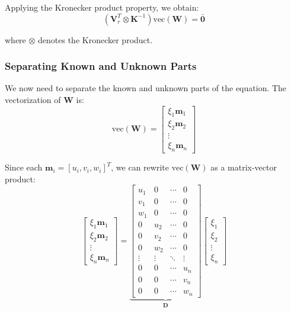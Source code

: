 \documentclass[11pt,a4paper]{article}
\theoremstyle{definition}
\theoremstyle{plain}
\theoremstyle{remark}
\begin{document}
Applying the Kronecker product property, we obtain:
\begin{equation} \nonumber
(\mathbf{V}_r^T \otimes \mathbf{K}^{-1}) \text{vec}(\mathbf{W}) = \bar{\mathbf{0}}
\end{equation}

where $\otimes$ denotes the Kronecker product.

\subsubsection{Separating Known and Unknown Parts}

We now need to separate the known and unknown parts of the equation. The vectorization of $\mathbf{W}$ is:
\begin{equation} \nonumber
\text{vec}(\mathbf{W}) = \begin{bmatrix} \xi_1 \mathbf{m}_1 \\ \xi_2 \mathbf{m}_2 \\ \vdots \\ \xi_n \mathbf{m}_n \end{bmatrix}
\end{equation}

Since each $\mathbf{m}_i = [u_i, v_i, w_i]^T$, we can rewrite $\text{vec}(\mathbf{W})$ as a matrix-vector product:
\begin{equation} \nonumber
\begin{bmatrix} \xi_1 \mathbf{m}_1 \\ \xi_2 \mathbf{m}_2 \\ \vdots \\ \xi_n \mathbf{m}_n \end{bmatrix} = 
\underbrace{\begin{bmatrix} 
    u_1 & 0 & \cdots & 0 \\
    v_1 & 0 & \cdots & 0 \\
    w_1 & 0 & \cdots & 0 \\
    0 & u_2 & \cdots & 0 \\
    0 & v_2 & \cdots & 0 \\
    0 & w_2 & \cdots & 0 \\
    \vdots & \vdots & \ddots & \vdots \\
    0 & 0 & \cdots & u_n \\
    0 & 0 & \cdots & v_n \\
    0 & 0 & \cdots & w_n
\end{bmatrix}}_{\mathbf{D}} \begin{bmatrix} \xi_1 \\ \xi_2 \\ \vdots \\ \xi_n \end{bmatrix}
\end{equation}
\end{document}
